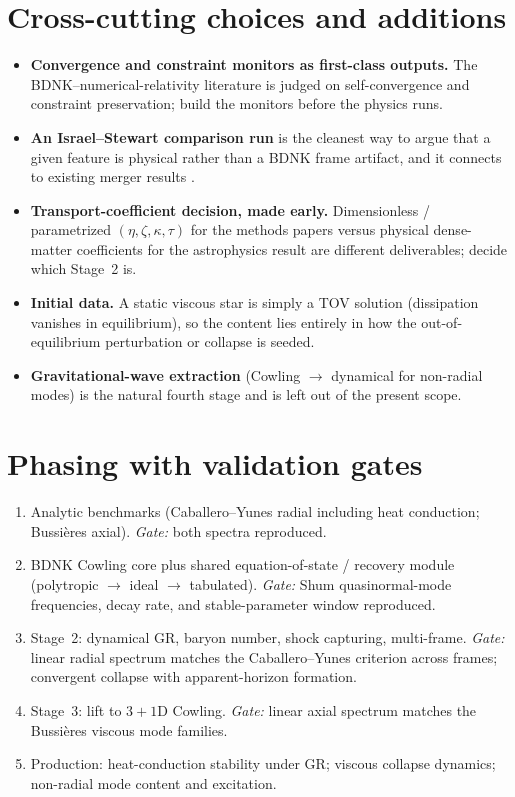 \documentclass[11pt]{article}
\begin{document}
\section{Cross-cutting choices and additions}
\begin{itemize}
\item \textbf{Convergence and constraint monitors as first-class outputs.} The
BDNK--numerical-relativity literature is judged on self-convergence and constraint
preservation; build the monitors before the physics runs.

\item \textbf{An Israel--Stewart comparison run}  is the
cleanest way to argue that a given feature is physical rather than a BDNK frame
artifact, and it connects to existing merger results \cite{ChabanovRezzolla2023}.

\item \textbf{Transport-coefficient decision, made early.} Dimensionless /
parametrized $(\eta,\zeta,\kappa,\tau)$ for the methods papers versus physical
dense-matter coefficients for the astrophysics result are different deliverables;
decide which Stage~2 is.

\item \textbf{Initial data.} A static viscous star is simply a TOV solution
(dissipation vanishes in equilibrium), so the content lies entirely in how the
out-of-equilibrium perturbation or collapse is seeded.

\item \textbf{Gravitational-wave extraction} (Cowling $\to$ dynamical for non-radial
modes) is the natural fourth stage and is left out of the present scope.
\end{itemize}

\section{Phasing with validation gates}
\begin{enumerate}
\item Analytic benchmarks (Caballero--Yunes radial including heat conduction;
Bussi\`eres axial). \emph{Gate:} both spectra reproduced.
\item BDNK Cowling core plus shared equation-of-state / recovery module
(polytropic $\to$ ideal $\to$ tabulated). \emph{Gate:} Shum quasinormal-mode
frequencies, decay rate, and stable-parameter window reproduced.
\item Stage~2: dynamical GR, baryon number, shock capturing, multi-frame.
\emph{Gate:} linear radial spectrum matches the Caballero--Yunes criterion across
frames; convergent collapse with apparent-horizon formation.
\item Stage~3: lift to $3{+}1$D Cowling. \emph{Gate:} linear axial spectrum matches
the Bussi\`eres viscous mode families.
\item Production: heat-conduction stability under GR; viscous collapse dynamics;
non-radial mode content and excitation.
\end{enumerate}
\end{document}
